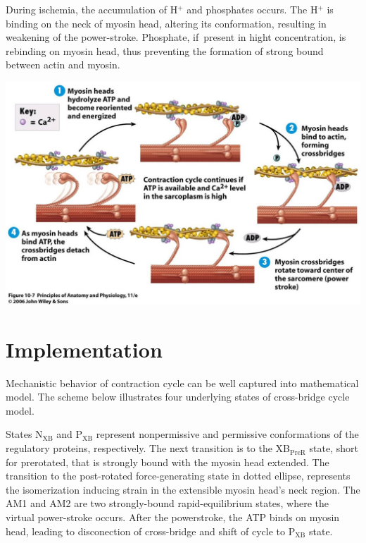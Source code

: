 \documentclass[a0,portrait]{a0poster}
\begin{document}
\begin{multicols}{2}
During ischemia, the accumulation of  H${\mathrm{^+}}$ and phosphates
occurs. The H${\mathrm{^+}}$ is binding on the neck of myosin head,
altering its conformation, resulting in weakening of the power-stroke.
Phosphate, if~present in hight concentration, is rebinding on myosin
head, thus preventing the formation of strong bound between actin and
myosin.

\begin{center}\vspace{0.8cm}
\includegraphics[scale=0.65]{muscle-contraction_hi-res}
\end{center}%


\section*{Implementation}

Mechanistic behavior of contraction cycle can be well captured into
mathematical model. The scheme below illustrates four underlying states
of cross-bridge cycle model. 

States N$_{\mathrm{XB}}$ and P$_{\mathrm{XB}}$ represent nonpermissive and
permissive conformations of the regulatory proteins, respectively. The
next transition is to the XB$_{\mathrm{PreR}}$ state, short for
prerotated, that is strongly bound with the myosin head extended. The
transition to the post-rotated force-generating state in dotted ellipse,
represents the isomerization inducing strain in the extensible myosin
head's neck region. The AM1 and AM2 are two strongly-bound
rapid-equilibrium states, where the virtual power-stroke occurs. After the
powerstroke, the ATP binds on myosin head, leading to disconection of
cross-bridge and shift of cycle to P$_{\mathrm{XB}}$ state.


\end{multicols}
\end{document}
